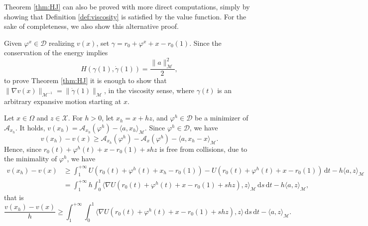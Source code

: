 \documentclass[a4paper,10pt]{amsart}
\newcommand{\ud}{\mathrm{d}}
\theoremstyle{plain}
\theoremstyle{definition}
\numberwithin{equation}{section}
\numberwithin{thm}{section}
\begin{document}
    Theorem \ref{thm:HJ} can also be proved with more direct computations, simply by showing that Definition \ref{def:viscosity} is satisfied by the value function. For the sake of completeness, we also show this alternative proof.

    Given $\varphi^x\in\mathcal{D}$ realizing $v(x)$, set $\gamma=r_0+\varphi^x+x-r_0(1)$. Since the conservation of the energy implies
    \[
    H(\gamma(1),\dot \gamma(1))= \frac{\|a\|_\mathcal{M}^2}{2},
    \]
    to prove Theorem \ref{thm:HJ} it is enough to show that $\|\nabla v(x)\|_{\mathcal{M}^{-1}}=\|\dot\gamma(1)\|_\mathcal{M}$, in the viscosity sense, where $\gamma(t)$ is an arbitrary expansive motion starting at $x$.
    

\smallskip
Let $x \in \Omega$ and $z \in \mathcal{X}$. For $h>0$, let $x_h = x+hz$, and $\varphi^h \in \mathcal{D}$ be a minimizer of $\mathcal{A}_{x_h}$. It holds, $v(x_h)=\mathcal{A}_{x_h}(\varphi^h)-\langle a, x_h\rangle_\mathcal{M}$. Since $\varphi^h \in \mathcal{D}$, we have
\[
v(x_h)-v(x) \ge \mathcal{A}_{x_h}(\varphi^h)-\mathcal{A}_x(\varphi^h) - \langle a, x_h-x\rangle_\mathcal{M}.
\]
Hence, since $r_0(t)+\varphi^h(t)+x-r_0(1)+s h z $ is free from collisions, due to the minimality of $\varphi^h$, we have
\[
\begin{split} 
v(x_h)-v(x) &\ge \int_{1}^{+\infty} U(r_0(t)+\varphi^h(t)+x_h -r_0(1))-U(r_0(t)+\varphi^h(t)+x-r_0(1)) \, \ud t -h\langle a, z\rangle_\mathcal{M} 
\\
&=\int_{1}^{+\infty} h \int_0^1 \langle \nabla U(r_0(t)+\varphi^h(t)+x-r_0(1)+shz),z\rangle_\mathcal{M} \, \ud s\, \ud t - h\langle a, z\rangle_\mathcal{M},
\end{split}
\]
that is
\[
\frac{v(x_h)-v(x)}{h} \ge \int_{1}^{+\infty} \int_0^1 \langle \nabla U(r_0(t)+\varphi^h(t)+x-r_0(1)+shz),z\rangle \, \ud s\, \ud t - \langle a, z\rangle_\mathcal{M}.
\]
\end{document}
